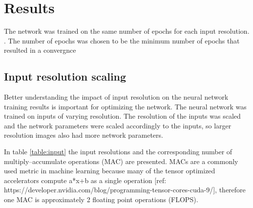 %
\chapter{Results}
\label{sec:results}

The network was trained on the same number of epochs for each input resolution. . The number of epochs was chosen to be the minimum number of epochs that resulted in a convergnce


\section{Input resolution scaling}

Better understanding the impact of input resolution on the neural network training results is important for optimizing the network. The neural network was trained on inputs of varying resolution. The resolution of the inputs was scaled and the network parameters were scaled accordingly to the inputs, so larger resolution images also had more network parameters.

In table \ref{table:input} the input resolutions and the corresponding number of multiply–accumulate operations (MAC) are presented. MACs are a commonly used metric in machine learning because many of the tensor optimized accelerators compute a*x+b as a single operation [ref: https://developer.nvidia.com/blog/programming-tensor-cores-cuda-9/], therefore one MAC is approximately 2 floating point operations (FLOPS).

